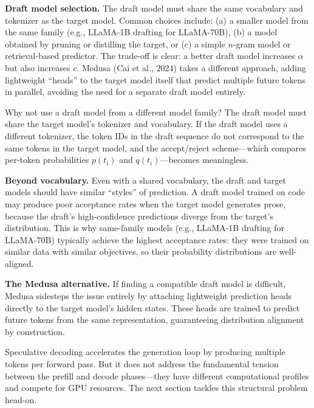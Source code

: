 \begin{notebox}
\textbf{Draft model selection.} The draft model must share the same vocabulary and tokenizer as the target model. Common choices include: (a) a smaller model from the same family (e.g., LLaMA-1B drafting for LLaMA-70B), (b) a model obtained by pruning or distilling the target, or (c) a simple $n$-gram model or retrieval-based predictor. The trade-off is clear: a better draft model increases $\alpha$ but also increases $c$. Medusa (Cai et al., 2024) takes a different approach, adding lightweight ``heads'' to the target model itself that predict multiple future tokens in parallel, avoiding the need for a separate draft model entirely.
\end{notebox}

\begin{whynotbox}{Why not use a draft model from a different model family?}
The draft model must share the target model's tokenizer and vocabulary. If the draft model uses a different tokenizer, the token IDs in the draft sequence do not correspond to the same tokens in the target model, and the accept/reject scheme---which compares per-token probabilities $p(t_i)$ and $q(t_i)$---becomes meaningless.

\textbf{Beyond vocabulary.} Even with a shared vocabulary, the draft and target models should have similar ``styles'' of prediction. A draft model trained on code may produce poor acceptance rates when the target model generates prose, because the draft's high-confidence predictions diverge from the target's distribution. This is why same-family models (e.g., LLaMA-1B drafting for LLaMA-70B) typically achieve the highest acceptance rates: they were trained on similar data with similar objectives, so their probability distributions are well-aligned.

\textbf{The Medusa alternative.} If finding a compatible draft model is difficult, Medusa sidesteps the issue entirely by attaching lightweight prediction heads directly to the target model's hidden states. These heads are trained to predict future tokens from the same representation, guaranteeing distribution alignment by construction.
\end{whynotbox}

Speculative decoding accelerates the generation loop by producing multiple tokens per forward pass. But it does not address the fundamental tension between the prefill and decode phases---they have different computational profiles and compete for GPU resources. The next section tackles this structural problem head-on.

